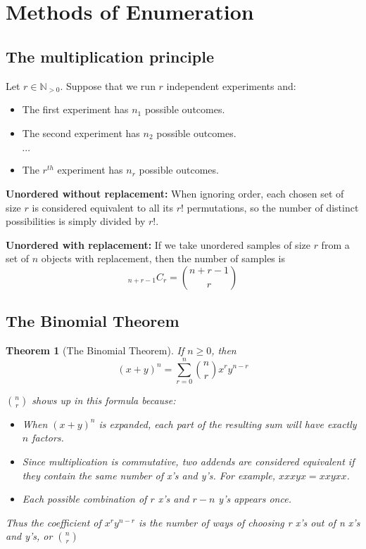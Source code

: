 \documentclass[
]{article}
\newtheorem{theorem}{Theorem}[section]
\theoremstyle{definition}
\theoremstyle{definition}
\theoremstyle{definition}
\theoremstyle{remark}
\begin{document}
\section{Methods of Enumeration}

\subsection{The multiplication principle}

Let $r\in\mathbb{N}_{>0}$. Suppose that we run $r$ independent experiments and:
\begin{itemize}
  \item The first experiment has $n_1$ possible outcomes.
  \item The second experiment has $n_2$ possible outcomes.

        $\cdots$
  \item The $r^{th}$ experiment has $n_r$ possible outcomes.
\end{itemize}

\textbf{Unordered without replacement:} When ignoring order, each chosen set of size $r$ is considered equivalent to all its $r!$ permutations, so the number of distinct possibilities is simply divided by $r!$.

\textbf{Unordered with replacement:} If we take unordered samples of size $r$ from a set of $n$ objects with replacement, then the number of samples is \[_{n+r-1}C_r={n+r-1\choose r}\]

\subsection{The Binomial Theorem}

\begin{theorem}[The Binomial Theorem]
  If $n\geq 0$, then \[(x+y)^n=\sum_{r=0}^n{n\choose r}x^ry^{n-r}\]

  ${n\choose r}$ shows up in this formula because:
  \begin{itemize}
    \item When $(x+y)^n$ is expanded, each part of the resulting sum will have exactly $n$ factors.
    \item Since multiplication is commutative, two addends are considered equivalent if they contain the same number of x's and y's. For example, $xxxyx=xxyxx$.
    \item Each possible combination of $r$ x's and $r-n$ y's appears once.
  \end{itemize}

  Thus the coefficient of $x^ry^{n-r}$ is the number of ways of choosing r x's out of n x's and y's, or ${n\choose r}$
\end{theorem}
\end{document}
